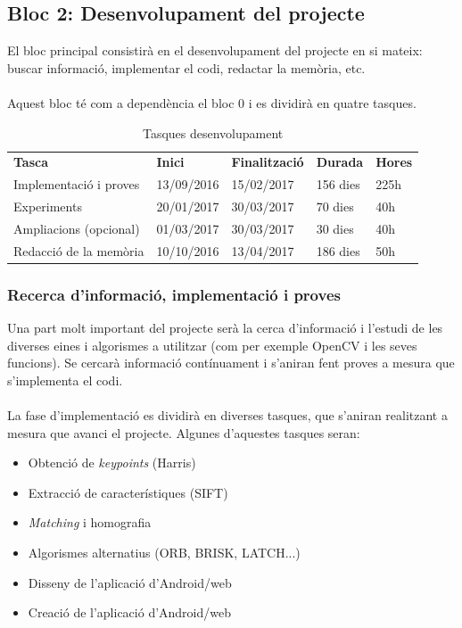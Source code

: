 	\subsection{Bloc 2: Desenvolupament del projecte}
			El bloc principal consistirà en el desenvolupament del projecte en si mateix: buscar informació, implementar el codi, redactar la memòria, etc.\\\\
			Aquest bloc té com a dependència el bloc 0 i es dividirà en quatre tasques.\\
			\begin{table}[H]
				\begin{center}
					\begin{tabular}{p{5cm} !{\vrule width -1pt}x{2.1cm} !{\vrule width -1pt}x{2.4cm} !{\vrule width -1pt}x{1.6cm} !{\vrule width -1pt}x{1.6cm}}
						\textbf{Tasca} & \textbf{Inici} & \textbf{Finalització} & \textbf{Durada} & \textbf{Hores} \\ %
						Implementació i proves & 13/09/2016 & 15/02/2017 & 156 dies & 225h \\
						Experiments & 20/01/2017 & 30/03/2017 & 70 dies & 40h \\
						Ampliacions (opcional) & 01/03/2017 & 30/03/2017 & 30 dies & 40h \\
						Redacció de la memòria & 10/10/2016 & 13/04/2017 & 186 dies & 50h \\
					\end{tabular}
				\end{center}
				\caption{Tasques desenvolupament}
			\end{table}

		\subsubsection{Recerca d'informació, implementació i proves}
			Una part molt important del projecte serà la cerca d'informació i l'estudi de les diverses eines i algorismes a utilitzar (com per exemple OpenCV i les seves funcions).
			Se cercarà informació contínuament i s'aniran fent proves a mesura que s'implementa el codi.\\\\
			La fase d'implementació es dividirà en diverses tasques, que s'aniran realitzant a mesura que avanci el projecte. Algunes d'aquestes tasques seran:\\
			\begin{itemize}
				\item{Obtenció de \textit{keypoints} (Harris)}
				\item{Extracció de característiques (SIFT)}
				\item{\textit{Matching} i homografia}
				\item{Algorismes alternatius (ORB\cite{Rublee:2011:OEA:2355573.2356268}, BRISK\cite{Leutenegger:2011:BBR:2355573.2356277}, LATCH...)}
				\item{Disseny de l'aplicació d'Android/web}
				\item{Creació de l'aplicació d'Android/web}
			\end{itemize}
